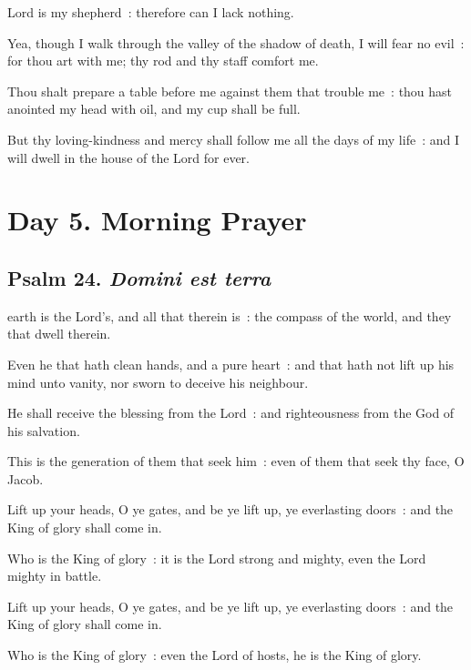  Lord is my shepherd~: therefore can I lack nothing.\par
{}
Yea, though I walk through the valley of the shadow of death, I will fear no evil~: for thou art with me; thy rod and thy staff comfort me.\par
{}Thou shalt prepare a table before me against them that trouble me~: thou hast anointed my head with oil, and my cup shall be full.\par
{}But thy loving-kindness and mercy shall follow me all the days of my life~: and I will dwell in the house of the Lord for ever.\par

\section*{Day 5. Morning Prayer}

\subsection{Psalm 24. \textit{Domini est terra}}

 earth is the Lord's, and all that therein is~: the compass of the world, and they that dwell therein.\par
{}
Even he that hath clean hands, and a pure heart~: and that hath not lift up his mind unto vanity, nor sworn to deceive his neighbour.\par
{}He shall receive the blessing from the Lord~: and righteousness from the God of his salvation.\par
{}This is the generation of them that seek him~: even of them that seek thy face, O Jacob.\par
{}Lift up your heads, O ye gates, and be ye lift up, ye everlasting doors~: and the King of glory shall come in.\par
{}Who is the King of glory~: it is the Lord strong and mighty, even the Lord mighty in battle.\par
{}Lift up your heads, O ye gates, and be ye lift up, ye everlasting doors~: and the King of glory shall come in.\par
{}Who is the King of glory~: even the Lord of hosts, he is the King of glory.\par

